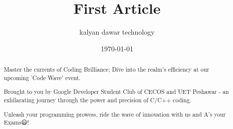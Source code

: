\documentclass{article}
\begin{document}
\title{First Article}
\author{kalyan dawar technology}
\date{\today}
\maketitle
\begin{abstract}
Master the currents of Coding Brilliance; Dive into the realm’s efficiency at our upcoming 'Code Wave' event. 

Brought to you by Google Developer Student Club of CECOS and UET Peshawar - an exhilarating journey through the power and precision of C/C++ coding.

Unleash your programming prowess, ride the wave of innovation with us and A's your Exams😃!
\end{abstract}
\end{document}

